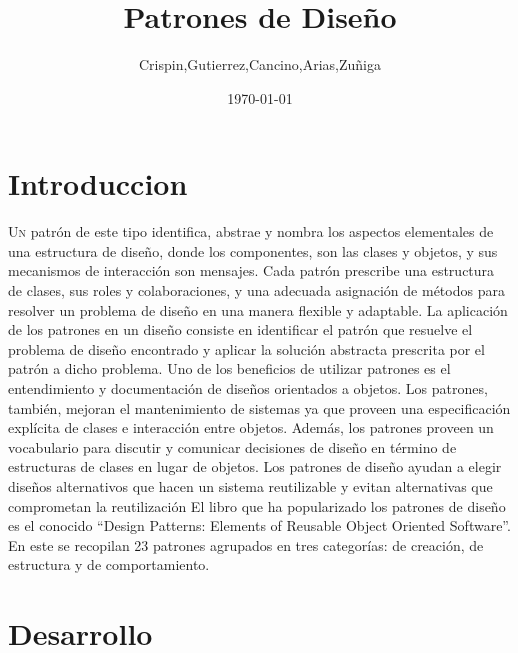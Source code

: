\documentclass[twoside,twocolumn]{article}
\title{Patrones de Diseño} %
\author{Crispin,Gutierrez,Cancino,Arias,Zuñiga}
\date{\today} %
\begin{document}
\maketitle


\section{Introduccion}

\lettrine[nindent=0em,lines=3]{U}n patrón de este tipo identifica, abstrae y nombra los aspectos elementales de una estructura de diseño, donde los componentes, son las clases y objetos, y sus mecanismos de interacción son mensajes.  
Cada patrón prescribe una estructura de clases, sus roles y colaboraciones, y una adecuada asignación de métodos para resolver un problema de diseño en una manera flexible y adaptable.  
La aplicación de los patrones en un diseño consiste en identificar el patrón que resuelve el problema de diseño encontrado y aplicar la solución abstracta prescrita por el patrón a dicho problema. 
Uno de los beneficios de utilizar patrones es el entendimiento y documentación de diseños orientados a objetos. Los patrones, también, mejoran el mantenimiento de sistemas ya que proveen una especificación explícita de clases e interacción entre objetos. Además, los patrones proveen un vocabulario para discutir y comunicar decisiones de diseño en término de estructuras de clases en lugar de objetos.  
Los patrones de diseño ayudan a elegir diseños alternativos que hacen un sistema reutilizable y evitan alternativas que comprometan la reutilización  
El libro que ha popularizado los patrones de diseño es el conocido “Design Patterns: Elements of Reusable Object Oriented Software”. En este se recopilan 23 patrones agrupados en tres categorías: de creación, de estructura y de comportamiento.
\section{Desarrollo}
\end{document}
